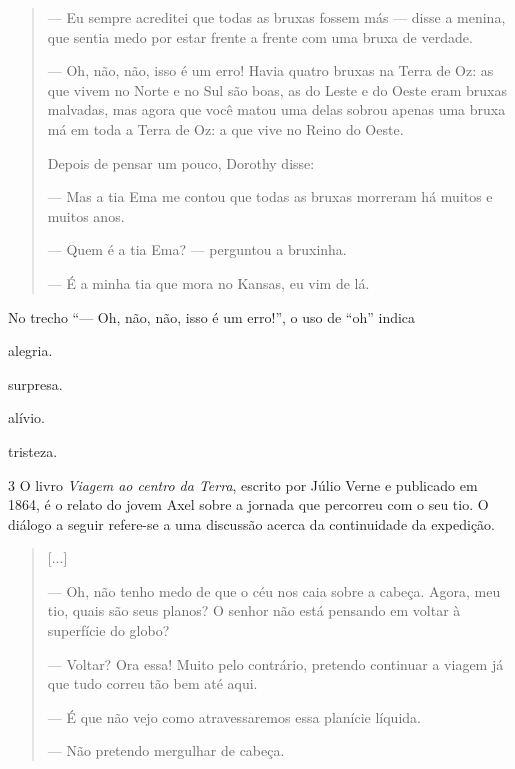\begin{quote}
--- Eu sempre acreditei que todas as bruxas fossem más --- disse a menina,
que sentia medo por estar frente a frente com uma bruxa de verdade.

--- Oh, não, não, isso é um erro! Havia quatro bruxas na Terra de Oz: as
que vivem no Norte e no Sul são boas, as do Leste e do Oeste eram bruxas
malvadas, mas agora que você matou uma delas sobrou apenas uma bruxa má
em toda a Terra de Oz: a que vive no Reino do Oeste.

Depois de pensar um pouco, Dorothy disse:

--- Mas a tia Ema me contou que todas as bruxas morreram há muitos e
muitos anos.

--- Quem é a tia Ema? --- perguntou a bruxinha.

--- É a minha tia que mora no Kansas, eu vim de lá.

\end{quote}

No trecho ``--- Oh, não, não, isso é um erro!'', o uso de ``oh'' indica

\begin{escolha}
\item alegria.

\item surpresa.

\item alívio.

\item tristeza.
\end{escolha}

\num{3} O livro \textit{Viagem ao centro da Terra}, escrito por Júlio Verne e
publicado em 1864, é o relato do jovem Axel sobre a jornada que
percorreu com o seu tio. O diálogo a seguir refere-se a uma discussão
acerca da continuidade da expedição.

\begin{quote}
{[}...{]}

--- Oh, não tenho medo de que o céu nos caia sobre a cabeça. Agora, meu
tio, quais são seus planos? O senhor não está pensando em voltar à
superfície do globo?

--- Voltar? Ora essa! Muito pelo contrário, pretendo continuar a viagem
já que tudo correu tão bem até aqui.

--- É que não vejo como atravessaremos essa planície líquida.

--- Não pretendo mergulhar de cabeça.
\end{quote}


